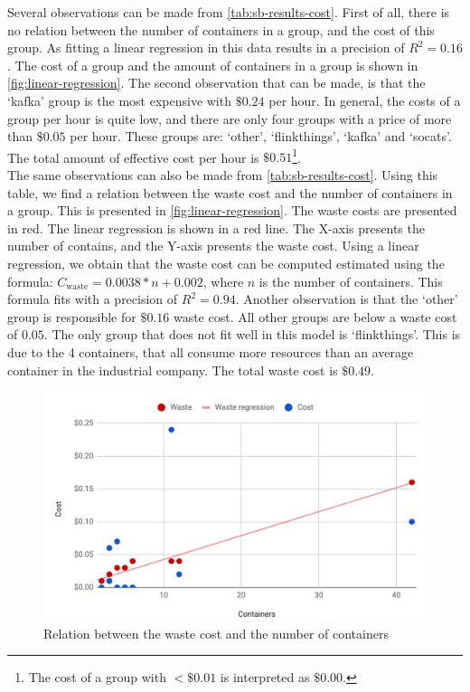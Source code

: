 \noindent
Several observations can be made from \autoref{tab:sb-results-cost}. First of all, there is no relation between the number of containers in a group, and the cost of this group. As fitting a linear regression in this data results in a precision of $R^2 = 0.16$. The cost of a group and the amount of containers in a group is shown in \autoref{fig:linear-regression}. The second observation that can be made, is that the `kafka' group is the most expensive with $\$ 0.24$ per hour. In general, the costs of a group per hour is quite low, and there are only four groups with a price of more than $\$0.05$ per hour. These groups are: `other', `flinkthings', `kafka' and `socats'. The total amount of effective cost per hour is $\$0.51$\footnote{The cost of a group with $<\$0.01$ is interpreted as $\$0.00$.}.\\

\noindent
The same observations can also be made from \autoref{tab:sb-results-cost}. Using this table, we find a relation between the waste cost and the number of containers in a group. This is presented in \autoref{fig:linear-regression}. The waste costs are presented in red. The linear regression is shown in a red line. The X-axis presents the number of contains, and the Y-axis presents the waste cost. Using a linear regression, we obtain that the waste cost can be computed estimated using the formula: $C_\text{waste} = 0.0038*n + 0.002$, where $n$ is the number of containers. This formula fits with a precision of $R^2 = 0.94$. Another observation is that the `other' group is responsible for $\$0.16$ waste cost. All other groups are below a waste cost of $0.05$. The only group that does not fit well in this model is `flinkthings'. This is due to the 4 containers, that all consume more resources than an average container in the industrial company. The total waste cost is $\$0.49$.\\


\begin{figure}
    \centering
    \includegraphics[width=\textwidth]{gfx/linear-regression.png}
    \caption{Relation between the waste cost and the number of containers}
    \label{fig:linear-regression}
\end{figure}

